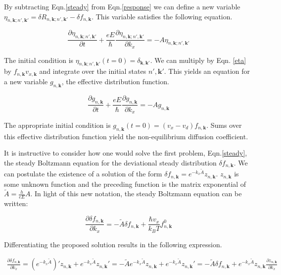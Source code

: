 \documentclass[preprint,12pt]{elsarticle}
\begin{document}
\noindent By subtracting Eqn.\ref{steady} from Eqn.\ref{response} we can define a new variable $\eta_{n,\mathbf{k};n',\mathbf{k'}} = \delta R_{n,\mathbf{k};n',\mathbf{k'}} - \delta f_{n,\mathbf{k}}$. This variable satisfies the following equation.

\begin{equation} \label{eta}
    \frac{\partial \eta_{n,\mathbf{k};n',\mathbf{k'}}}{\partial t}+\frac{eE}{\hbar} \frac{\partial \eta_{n,\mathbf{k};n',\mathbf{k'}}}{\partial k_x} = - A \eta_{n,\mathbf{k};n',\mathbf{k'}}
\end{equation}

\noindent The initial condition is $\eta_{n,\mathbf{k};n',\mathbf{k'}}(t=0) = \delta_{\mathbf{k},\mathbf{k'}}$. We can multiply by Eqn. \ref{eta} by $f_{n,\mathbf{k}} v_{x,\mathbf{k}}$ and integrate over the initial states $n',\mathbf{k'}$. This yields an equation for a new variable $g_{n,\mathbf{k}}$, the effective distribution function.

\begin{equation}
    \frac{\partial g_{n,\mathbf{k}}}{\partial t}+\frac{eE}{\hbar} \frac{\partial g_{n,\mathbf{k}}}{\partial k_x} = -A g_{n,\mathbf{k}}
\end{equation}

\noindent The appropriate initial condition is $g_{n,\mathbf{k}}(t=0) = (v_x - v_d) f_{n,\mathbf{k}}$. Sums over this effective distribution function yield the non-equilibrium diffusion coefficient. 

\noindent It is instructive to consider how one would solve the first problem, Eqn.\ref{steady}, the steady Boltzmann equation for the deviational steady distribution $\delta f_{n,\mathbf{k}}$. We can postulate the existence of a solution of the form $\delta f_{n,\mathbf{k}} = e^{-k_x \tilde{A}} z_{n,\mathbf{k}}$. $z_{n,\mathbf{k}}$ is some unknown function and the preceding function is the matrix exponential of $\tilde{A} = \frac{h}{eE} A$. In light of this new notation, the steady Boltzmann equation can be written:

\begin{equation}
    \frac{\partial \delta f_{n,\mathbf{k}}}{\partial k_x} = -\tilde{A} \delta f_{n,\mathbf{k}} + \frac{\hbar v_x}{k_B T} f_{n,\mathbf{k}}^0
\end{equation}

Differentiating the proposed solution results in the following expression.

\begin{multline}
    \frac{\partial \delta f_{n,\mathbf{k}}}{\partial k_x} = (e^{-k_x \tilde{A}})' z_{n,\mathbf{k}} + e^{-k_x \tilde{A}} z_{n,\mathbf{k}}' = -\tilde{A} e^{-k_x \tilde{A}} z_{n,\mathbf{k}} + e^{-k_x \tilde{A}} z_{n,\mathbf{k}}' = -\tilde{A} \delta f_{n,\mathbf{k}} + e^{-k_x \tilde{A}} z_{n,\mathbf{k}} \frac{\partial z_{n,\mathbf{k}}}{\partial k_x} 
\end{multline}
\end{document}
